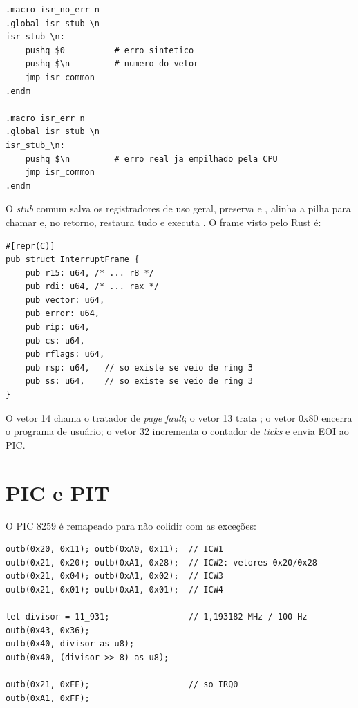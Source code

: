 \begin{lstlisting}[caption={Stubs que normalizam o c\'odigo de erro.},label={lst:isrstubs}]
.macro isr_no_err n
.global isr_stub_\n
isr_stub_\n:
    pushq $0          # erro sintetico
    pushq $\n         # numero do vetor
    jmp isr_common
.endm

.macro isr_err n
.global isr_stub_\n
isr_stub_\n:
    pushq $\n         # erro real ja empilhado pela CPU
    jmp isr_common
.endm
\end{lstlisting}

O \emph{stub} comum salva os registradores de uso geral, preserva
 e , alinha a pilha para chamar
 e, no retorno, restaura tudo e executa
. O frame visto pelo Rust \'e:

\begin{lstlisting}[caption={Layout de \code{InterruptFrame} ap\'os o stub comum.},label={lst:frame}]
#[repr(C)]
pub struct InterruptFrame {
    pub r15: u64, /* ... r8 */
    pub rdi: u64, /* ... rax */
    pub vector: u64,
    pub error: u64,
    pub rip: u64,
    pub cs: u64,
    pub rflags: u64,
    pub rsp: u64,   // so existe se veio de ring 3
    pub ss: u64,    // so existe se veio de ring 3
}
\end{lstlisting}

O vetor 14 chama o tratador de \emph{page fault}; o vetor 13 trata
; o vetor 0x80 encerra o programa de usu\'ario; o vetor 32
incrementa o contador de \emph{ticks} e envia EOI ao PIC.

\section{PIC e PIT}

O PIC 8259 \'e remapeado para n\~ao colidir com as exce\c{c}\~oes:

\begin{lstlisting}[caption={Remapeamento do PIC e inicializa\c{c}\~ao do PIT.},label={lst:picpit}]
outb(0x20, 0x11); outb(0xA0, 0x11);  // ICW1
outb(0x21, 0x20); outb(0xA1, 0x28);  // ICW2: vetores 0x20/0x28
outb(0x21, 0x04); outb(0xA1, 0x02);  // ICW3
outb(0x21, 0x01); outb(0xA1, 0x01);  // ICW4

let divisor = 11_931;                // 1,193182 MHz / 100 Hz
outb(0x43, 0x36);
outb(0x40, divisor as u8);
outb(0x40, (divisor >> 8) as u8);

outb(0x21, 0xFE);                    // so IRQ0
outb(0xA1, 0xFF);
\end{lstlisting}

